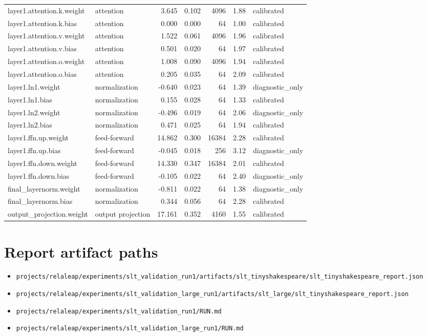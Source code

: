 \documentclass[11pt]{article}
\begin{document}
\begin{longtable}{p{}p{}rrrrp{}}
layer1.attention.k.weight & attention & 3.645 & 0.102 & 4096 & 1.88 & calibrated \\
layer1.attention.k.bias & attention & 0.000 & 0.000 & 64 & 1.00 & calibrated \\
layer1.attention.v.weight & attention & 1.522 & 0.061 & 4096 & 1.96 & calibrated \\
layer1.attention.v.bias & attention & 0.501 & 0.020 & 64 & 1.97 & calibrated \\
layer1.attention.o.weight & attention & 1.008 & 0.090 & 4096 & 1.94 & calibrated \\
layer1.attention.o.bias & attention & 0.205 & 0.035 & 64 & 2.09 & calibrated \\
layer1.ln1.weight & normalization & -0.640 & 0.023 & 64 & 1.39 & diagnostic\_only \\
layer1.ln1.bias & normalization & 0.155 & 0.028 & 64 & 1.33 & calibrated \\
layer1.ln2.weight & normalization & -0.496 & 0.019 & 64 & 2.06 & diagnostic\_only \\
layer1.ln2.bias & normalization & 0.471 & 0.025 & 64 & 1.94 & calibrated \\
layer1.ffn.up.weight & feed-forward & 14.862 & 0.300 & 16384 & 2.28 & calibrated \\
layer1.ffn.up.bias & feed-forward & -0.045 & 0.018 & 256 & 3.12 & diagnostic\_only \\
layer1.ffn.down.weight & feed-forward & 14.330 & 0.347 & 16384 & 2.01 & calibrated \\
layer1.ffn.down.bias & feed-forward & -0.105 & 0.022 & 64 & 2.40 & diagnostic\_only \\
final\_layernorm.weight & normalization & -0.811 & 0.022 & 64 & 1.38 & diagnostic\_only \\
final\_layernorm.bias & normalization & 0.344 & 0.056 & 64 & 2.28 & calibrated \\
output\_projection.weight & output projection & 17.161 & 0.352 & 4160 & 1.55 & calibrated \\
\bottomrule
\end{longtable}
\normalsize

\section{Report artifact paths}

\begin{itemize}[leftmargin=*]
\item \texttt{projects/relaleap/experiments/slt\_validation\_run1/artifacts/slt\_tinyshakespeare/slt\_tinyshakespeare\_report.json}
\item \texttt{projects/relaleap/experiments/slt\_validation\_large\_run1/artifacts/slt\_large/slt\_tinyshakespeare\_report.json}
\item \texttt{projects/relaleap/experiments/slt\_validation\_run1/RUN.md}
\item \texttt{projects/relaleap/experiments/slt\_validation\_large\_run1/RUN.md}
\end{itemize}
\end{document}

